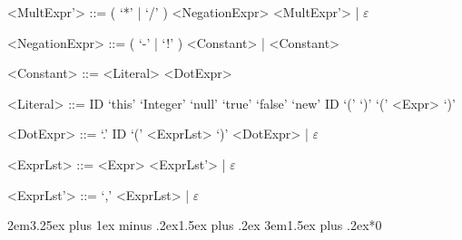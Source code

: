 \documentclass{report}
\begin{document}
\begin{grammar}
<MultExpr'> ::= ( `*' | `/' ) <NegationExpr> <MultExpr'> | $\varepsilon$

<NegationExpr> ::= ( `-' | `!' ) <Constant> | <Constant>

<Constant> ::= <Literal> <DotExpr>

<Literal> ::= ID
\alt `this'
\alt `Integer'
\alt `null'
\alt `true'
\alt `false'
\alt `new' ID `(' `)'
\alt `(' <Expr> `)'

<DotExpr> ::= `.' ID `(' <ExprLst> `)' <DotExpr> | $\varepsilon$

<ExprLst> ::= <Expr> <ExprLst'> | $\varepsilon$

<ExprLst'> ::= `,' <ExprLst> | $\varepsilon$

\end{grammar}


\titleformat{\subsection}[block]{}{\thesubsection}{1em}{}
\titleformat{\subsubsection}[block]{}{\thesubsubsection}{1em}{}
\titlespacing*{\subsection} {2em}{3.25ex plus 1ex minus .2ex}{1.5ex plus .2ex}
\titlespacing*{\subsubsection} {3em}{1.5ex plus .2ex}{*0}

\newpage
\end{document}
